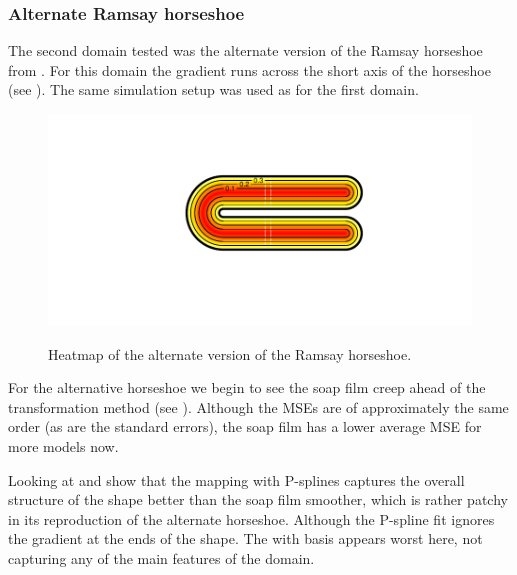 \subsubsection{Alternate Ramsay horseshoe}

The second domain tested was the alternate version of the Ramsay horseshoe from \cite{soap}. For this domain the gradient runs across the short axis of the horseshoe (see ). The same simulation setup was used as for the first domain.

\begin{figure}
\centering
\includegraphics[trim=0.5in 1in 0in 0.5in]{sc/figs/altramsayhorseshoe.pdf} \\
\caption{Heatmap of the alternate version of the Ramsay horseshoe.}
\label{altramsayhorseshoe}
\end{figure}

For the alternative horseshoe we begin to see the soap film creep ahead of the transformation method (see ). Although the MSEs are of approximately the same order (as are the standard errors), the soap film has a lower average MSE for more models now. 

Looking at  and show that the \sch mapping with P-splines captures the overall structure of the shape better than the soap film smoother, which is rather patchy in its reproduction of the alternate horseshoe. Although the P-spline fit ignores the gradient at the ends of the shape. The \sch with \tprs basis appears worst here, not capturing any of the main features of the domain.

